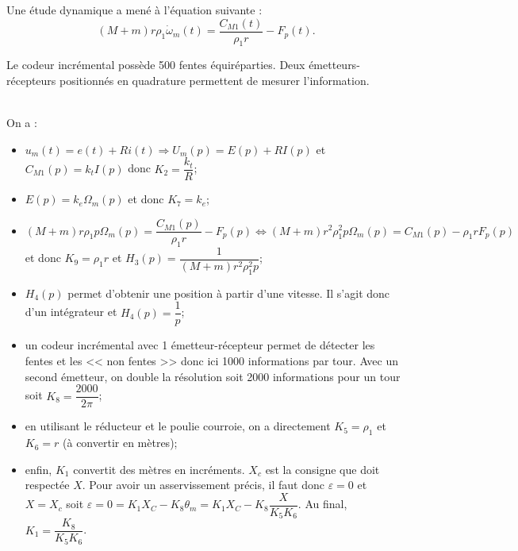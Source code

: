 Une étude dynamique a mené à l'équation suivante : 
$$\left(M+m\right)r\rho_1 \dot{\omega}_m(t)=\dfrac{C_{M1}(t)}{\rho_1 r}-F_p(t).$$

Le codeur incrémental possède 500 fentes équiréparties. Deux émetteurs-récepteurs positionnés en quadrature permettent de mesurer l'information. 
\fi

\ifprof
\begin{corrige}~\\
On a :
\begin{itemize}
\item $ u_m(t)=e(t)+Ri(t) \Rightarrow  U_m(p)=E(p)+RI(p) $ et $C_{M1}(p)=k_t I(p)$ donc $K_2 = \dfrac{k_t}{R}$;
\item $E(p)=k_e\Omega_m(p)$ et donc $K_7 = k_e$;
\item $\left(M+m\right)r\rho_1 p\Omega_m(p)=\dfrac{C_{M1}(p)}{\rho_1 r}-F_p(p) \Leftrightarrow\left(M+m\right)r^2\rho_1^2 p\Omega_m(p)=C_{M1}(p)-\rho_1 rF_p(p) $ et donc $K_9 = \rho_1 r$ et $H_3(p)=\dfrac{1}{\left(M+m\right)r^2\rho_1^2 p}$;
\item  $H_4(p)$ permet d'obtenir une position à partir d'une vitesse. Il s'agit donc d'un intégrateur et $H_4(p)=\dfrac{1}{p}$; 
\item un codeur incrémental avec 1 émetteur-récepteur permet de détecter les fentes et les << non fentes >> donc ici 1000 informations par tour. Avec un second émetteur, on double la résolution soit 2000 informations pour un tour soit $K_8  = \dfrac{2000}{2\pi}$;
\item en utilisant le réducteur et le poulie courroie, on a directement $K_5=\rho_1$ et $K_6=r$ (à convertir en mètres);
\item enfin, $K_1$ convertit des mètres en incréments. $X_c$ est la consigne que doit respectée $X$. Pour avoir un asservissement précis, il faut donc $\varepsilon = 0$ et $X=X_c$ soit $\varepsilon = 0 = K_1 X_C - K_8 \theta_m = K_1 X_C - K_8 \dfrac{X}{K_5 K_6}$. Au final, $K_1 =\dfrac{K_8}{K_5 K_6}$.
\end{itemize}
\end{corrige}
\else
\fi

